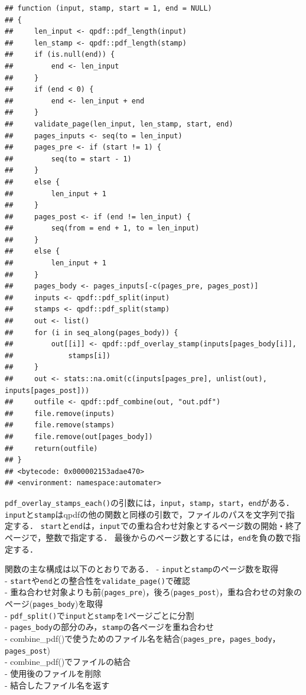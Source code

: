 \documentclass[
]{article}
\begin{document}
\begin{verbatim}
## function (input, stamp, start = 1, end = NULL) 
## {
##     len_input <- qpdf::pdf_length(input)
##     len_stamp <- qpdf::pdf_length(stamp)
##     if (is.null(end)) {
##         end <- len_input
##     }
##     if (end < 0) {
##         end <- len_input + end
##     }
##     validate_page(len_input, len_stamp, start, end)
##     pages_inputs <- seq(to = len_input)
##     pages_pre <- if (start != 1) {
##         seq(to = start - 1)
##     }
##     else {
##         len_input + 1
##     }
##     pages_post <- if (end != len_input) {
##         seq(from = end + 1, to = len_input)
##     }
##     else {
##         len_input + 1
##     }
##     pages_body <- pages_inputs[-c(pages_pre, pages_post)]
##     inputs <- qpdf::pdf_split(input)
##     stamps <- qpdf::pdf_split(stamp)
##     out <- list()
##     for (i in seq_along(pages_body)) {
##         out[[i]] <- qpdf::pdf_overlay_stamp(inputs[pages_body[i]], 
##             stamps[i])
##     }
##     out <- stats::na.omit(c(inputs[pages_pre], unlist(out), inputs[pages_post]))
##     outfile <- qpdf::pdf_combine(out, "out.pdf")
##     file.remove(inputs)
##     file.remove(stamps)
##     file.remove(out[pages_body])
##     return(outfile)
## }
## <bytecode: 0x000002153adae470>
## <environment: namespace:automater>
\end{verbatim}

\texttt{pdf\_overlay\_stamps\_each()}の引数には，\texttt{input}，\texttt{stamp}，\texttt{start}，\texttt{end}がある．
\texttt{input}と\texttt{stamp}はqpdfの他の関数と同様の引数で，ファイルのパスを文字列で指定する．
\texttt{start}と\texttt{end}は，\texttt{input}での重ね合わせ対象とするページ数の開始・終了ページで，整数で指定する．
最後からのページ数とするには，\texttt{end}を負の数で指定する．

関数の主な構成は以下のとおりである．
- \texttt{input}と\texttt{stamp}のページ数を取得\\
- \texttt{start}や\texttt{end}との整合性を\texttt{validate\_page()}で確認\\
- 重ね合わせ対象よりも前(\texttt{pages\_pre})，後ろ(\texttt{pages\_post})，重ね合わせの対象のページ(\texttt{pages\_body})を取得\\
- \texttt{pdf\_split()}で\texttt{input}と\texttt{stamp}を1ページごとに分割\\
- \texttt{pages\_body}の部分のみ，\texttt{stamp}の各ページを重ね合わせ\\
- combine\_pdf()で使うためのファイル名を結合(\texttt{pages\_pre}，\texttt{pages\_body}，\texttt{pages\_post})\\
- combine\_pdf()でファイルの結合\\
- 使用後のファイルを削除\\
- 結合したファイル名を返す
\end{document}

